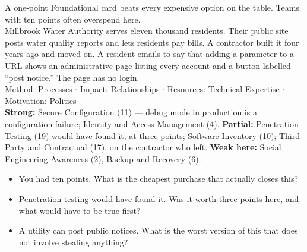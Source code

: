  A one-point Foundational card beats every expensive option
on the table. Teams with ten points often overspend here.\\
 Millbrook Water Authority serves eleven thousand residents.
Their public site posts water quality reports and lets residents pay bills. A
contractor built it four years ago and moved on. A resident emails to say that
adding a parameter to a URL shows an administrative page listing every account
and a button labelled ``post notice.'' The page has no login.\\
 Method: Processes $\cdot$ Impact:
Relationships $\cdot$ Resources: Technical Expertise $\cdot$ Motivation: Politics\\
 \textbf{Strong:} Secure Configuration (11) --- debug mode in
production is a configuration failure; Identity and Access Management (4).
\textbf{Partial:} Penetration Testing (19) would have found it, at three points;
Software Inventory (10); Third-Party and Contractual (17), on the contractor who
left. \textbf{Weak here:} Social Engineering Awareness (2), Backup and Recovery
(6).\\
\begin{itemize}
\item You had ten points. What is the cheapest purchase that actually closes this?
\item Penetration testing would have found it. Was it worth three points here, and
what would have to be true first?
\item A utility can post public notices. What is the worst version of this that
does not involve stealing anything?
\end{itemize}


